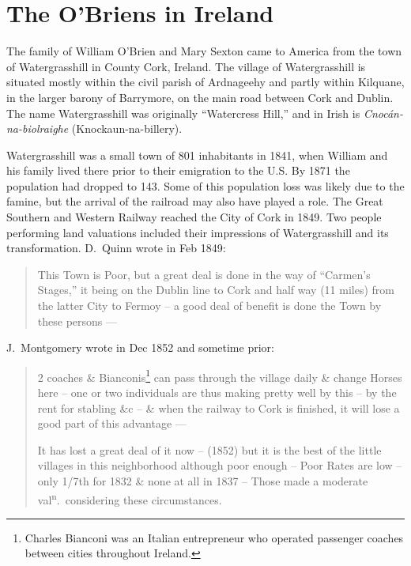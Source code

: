 \chapter{The O'Briens in Ireland}

The family of William O'Brien and Mary Sexton came to America from the town of Watergrasshill in County Cork, Ireland.\cite{Edward2OBrienNaturalization,Michael2OBrienNaturalization,Margaret3DooleyBaptism} The village of Watergrasshill is situated mostly within the civil parish of Ardnageehy and partly within Kilquane, in the larger barony of Barrymore, on the main road between Cork and Dublin.\cite{TopographicalDictionary} The name Watergrasshill was originally ``Watercress Hill,'' and in Irish is \textit{Cnoc\'{a}n-na-biolraighe} (Knockaun-na-billery).\cite{LocalNames} 

Watergrasshill was a small town of 801 inhabitants in 1841, when William and his family lived there prior to their emigration to the U.S. By 1871 the population had dropped to 143\cite{Population}. Some of this population loss was likely due to the famine, but the arrival of the railroad may also have played a role. The Great Southern and Western Railway reached the City of Cork in 1849.\cite{Bianconi} Two people performing land valuations included their impressions of Watergrasshill and its transformation. D.\ Quinn wrote in Feb 1849:

\begin{quote}
	This Town is Poor, but a great deal is done in the way of ``Carmen's Stages,'' it being on the Dublin line to Cork and half way (11 miles) from the latter City to Fermoy -- a good deal of benefit is done the Town by these persons ---\cite{HouseIntro}
\end{quote}

J.\ Montgomery wrote in Dec 1852 and sometime prior:

\begin{quote}
	2 coaches \& Bianconis\footnote{Charles Bianconi was an Italian entrepreneur who operated passenger coaches between cities throughout Ireland.\cite{Bianconi}} can pass through the village daily \& change Horses here -- one or two individuals are thus making pretty well by this -- by the rent for stabling \&c -- \& when the railway to Cork is finished, it will lose a good part of this advantage ---
	
	It has lost a great deal of it now -- (1852) but it is the best of the little villages in this neighborhood although poor enough -- Poor Rates are low -- only 1/7th for 1832 \& none at all in 1837 -- Those made a moderate val\textsuperscript{n}.\ considering these circumstances.\cite{HouseIntro}
\end{quote}

